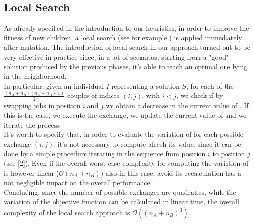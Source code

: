 \documentclass[opre,nonblindrev]{informs3} %
\begin{document}
\subsection{Local Search}
As already specified in the introduction to our heuristics, in order to improve the fitness of new children, a local search (see for example \cite{local}) is applied immediately after mutation. The introduction of local search in our approach turned out to be very effective in practice since, in a lot of scenarios, starting from a "good" solution produced by the previous phases, it's able to reach an optimal one lying in the neighborhood.\\
In particular, given an individual $I$ representing a solution $S$, for each of the $\frac{(n_A+n_B)(n_A+n_B-1)}{2}$ couples of indices $(i,j)$, with $i<j$,  we check if by swapping jobs in position $i$ and $j$ we obtain a decrease in the current value of . If this is the case, we execute the exchange, we update the current value of  and we iterate the process.\\
It's worth to specify that, in order to evaluate the variation of  for each possible exchange $(i,j)$, it's not necessary to compute afresh its value, since it can be done by a simple procedure iterating in the sequence from position $i$ to position $j$ (see [2]). Even if the overall worst-case complexity for computing the variation of  is however linear ($\mathcal{O}(n_A+n_B)$) also in this case, avoid its recalculation has a not negligible impact on the overall performance.\\
Concluding, since the number of possible exchanges are quadratics, while the variation of the objective function can be calculated in linear time, the overall complexity of the local search approach is $\mathcal{O}((n_A+n_B)^3)$.
\end{document}
